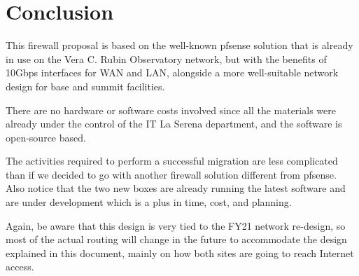 \section{Conclusion}

This firewall proposal is based on the well-known pfsense solution that is already in use on the Vera C. Rubin Observatory network, but with the benefits of 10Gbps interfaces for WAN and LAN, alongside a more well-suitable network design for base and summit facilities.

There are no hardware or software costs involved since all the materials were already under the control of the IT La Serena department, and the software is open-source based.

The activities required to perform a successful migration are less complicated than if we decided to go with another firewall solution different from pfsense. Also notice that the two new boxes are already running the latest software and are under development which is a plus in time, cost, and planning.

Again, be aware that this design is very tied to the FY21 network re-design, so most of the actual routing will change in the future to accommodate the design explained in this document, mainly on how both sites are going to reach Internet access. 